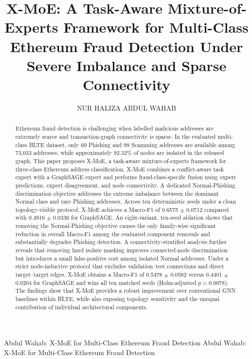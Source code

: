 \documentclass{ieeeaccess}
\begin{document}

\title{X-MoE: A Task-Aware Mixture-of-Experts Framework for Multi-Class Ethereum Fraud Detection Under Severe Imbalance and Sparse Connectivity}

\author{\uppercase{Nur Haliza Abdul Wahab}}
\address[1]{Digital Trust Centre (DTC), Nanyang Technological University (NTU), Singapore}
\address[2]{Faculty of Computing, Universiti Teknologi Malaysia (UTM), Johor Bahru, Malaysia}


\markboth
{Abdul Wahab: X-MoE for Multi-Class Ethereum Fraud Detection}
{Abdul Wahab: X-MoE for Multi-Class Ethereum Fraud Detection}


\begin{abstract}
Ethereum fraud detection is challenging when labelled malicious addresses are extremely scarce and transaction-graph connectivity is sparse. In the evaluated multi-class BLTE dataset, only 69 Phishing and 99 Scamming addresses are available among 73,033 addresses, while approximately 92.32\% of nodes are isolated in the released graph. This paper proposes X-MoE, a task-aware mixture-of-experts framework for three-class Ethereum address classification. X-MoE combines a conflict-aware task expert with a GraphSAGE expert and performs fraud-class-specific fusion using expert predictions, expert disagreement, and node connectivity. A dedicated Normal-Phishing discrimination objective addresses the extreme imbalance between the dominant Normal class and rare Phishing addresses. Across ten deterministic seeds under a clean topology-visible protocol, X-MoE achieves a Macro-F1 of 0.6575 $\pm$ 0.0712 compared with 0.4916 $\pm$ 0.0336 for GraphSAGE. An eight-variant, ten-seed ablation shows that removing the Normal-Phishing objective causes the only family-wise significant reduction in overall Macro-F1 among the evaluated component removals and substantially degrades Phishing detection. A connectivity-stratified analysis further reveals that removing hard isolate masking improves connected-node discrimination but introduces a small false-positive cost among isolated Normal addresses. Under a strict node-inductive protocol that excludes validation--test connections and direct target--target edges, X-MoE obtains a Macro-F1 of 0.5478 $\pm$ 0.0582 versus 0.4401 $\pm$ 0.0204 for GraphSAGE and wins all ten matched seeds (Holm-adjusted $p = 0.0078$). The findings show that X-MoE provides a robust improvement over conventional GNN baselines within BLTE, while also exposing topology sensitivity and the unequal contribution of individual architectural components.
\end{abstract}
\end{document}
